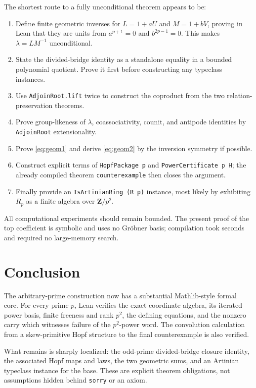 \documentclass[11pt]{article}
\newcommand{\Z}{\mathbf Z}
\begin{document}
The shortest route to a fully unconditional theorem appears to be:
\begin{enumerate}[leftmargin=2em]
\item Define finite geometric inverses for $L=1+aU$ and $M=1+bV$, proving in
      Lean that they are units from $a^{p+1}=0$ and $b^{2p-1}=0$.  This makes
      $\lambda=LM^{-1}$ unconditional.
\item State the divided-bridge identity as a standalone equality in a
      bounded polynomial quotient.  Prove it first before constructing any
      typeclass instances.
\item Use \texttt{AdjoinRoot.lift} twice to construct the coproduct from the
      two relation-preservation theorems.
\item Prove group-likeness of $\lambda$, coassociativity, counit, and antipode
      identities by \texttt{AdjoinRoot} extensionality.
\item Prove \eqref{eq:geom1} and derive \eqref{eq:geom2} by the inversion
      symmetry if possible.
\item Construct explicit terms of \texttt{HopfPackage p} and
      \texttt{PowerCertificate p H}; the already compiled theorem
      \texttt{counterexample} then closes the argument.
\item Finally provide an \texttt{IsArtinianRing (R p)} instance, most likely
      by exhibiting $R_p$ as a finite algebra over $\Z/p^2$.
\end{enumerate}

All computational experiments should remain bounded.  The present proof of
the top coefficient is symbolic and uses no Gr\"obner basis; compilation took
seconds and required no large-memory search.

\section{Conclusion}

The arbitrary-prime construction now has a substantial Mathlib-style formal
core.  For every prime $p$, Lean verifies the exact coordinate algebra, its
iterated power basis, finite freeness and rank $p^2$, the defining equations,
and the nonzero carry which witnesses failure of the $p^2$-power word.  The
convolution calculation from a skew-primitive Hopf structure to the final
counterexample is also verified.

What remains is sharply localized: the odd-prime divided-bridge closure
identity, the associated Hopf maps and laws, the two geometric sums, and an
Artinian typeclass instance for the base.  These are explicit theorem
obligations, not assumptions hidden behind \texttt{sorry} or an axiom.
\end{document}
